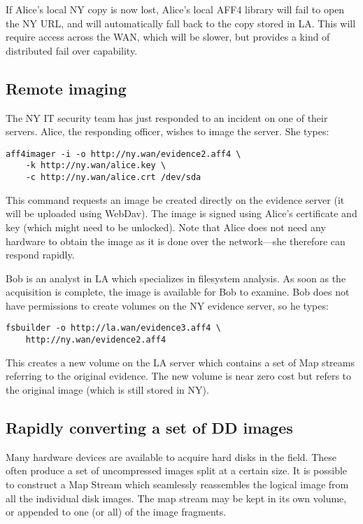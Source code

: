 \documentclass[10pt, conference]{IEEEtran}
\begin{document}
If Alice's local NY copy is now lost, Alice's local AFF4 library will
fail to open the NY URL, and will automatically fall back to the copy
stored in LA. This will require access across the WAN, which will be
slower, but provides a kind of distributed fail over capability.

\subsection{Remote imaging}
The NY IT security team has just responded to an incident on one of
their servers. Alice, the responding officer, wishes to image the
server. She types:
\begin{lstlisting}
aff4imager -i -o http://ny.wan/evidence2.aff4 \
	-k http://ny.wan/alice.key \
	-c http://ny.wan/alice.crt /dev/sda
\end{lstlisting}

This command requests an image be created directly on the evidence
server (it will be uploaded using WebDav). The image is signed using
Alice's certificate and key (which might need to be unlocked). Note
that Alice does not need any hardware to obtain the image as it is
done over the network---she therefore can respond rapidly.

Bob is an analyst in LA which specializes in filesystem analysis. As
soon as the acquisition is complete, the image is available for Bob to
examine. Bob does not have permissions to create volumes on the NY
evidence server, so he types:
\begin{lstlisting}
fsbuilder -o http://la.wan/evidence3.aff4 \
	http://ny.wan/evidence2.aff4
\end{lstlisting}
This creates a new volume on the LA server which contains a set of Map
streams referring to the original evidence. The new volume is near
zero cost but refers to the original image (which is still stored in
NY).

\subsection{Rapidly converting a set of DD images}
Many hardware devices are available to acquire hard disks in the
field. These often produce a set of uncompressed images split at a
certain size. It is possible to construct a Map Stream which
seamlessly reassembles the logical image from all the individual disk
images. The map stream may be kept in its own volume, or appended to
one (or all) of the image fragments.
\end{document}
